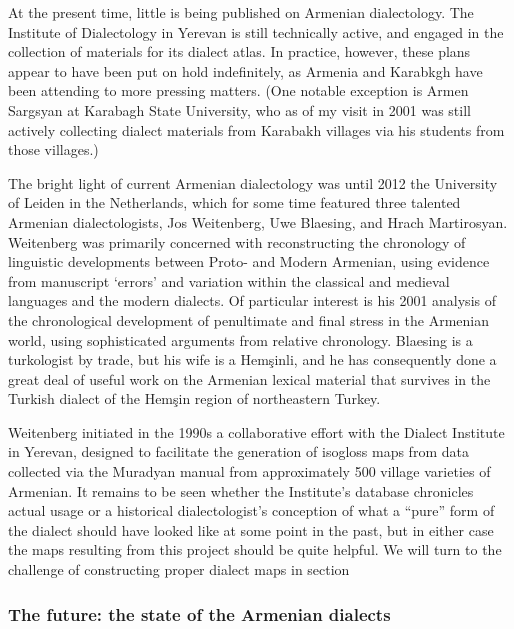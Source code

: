 At the present time, little is being published on Armenian dialectology. The Institute of Dialectology in Yerevan is still technically active, and engaged in the collection of materials for its dialect atlas. In practice, however, these plans appear to have been put on hold indefinitely, as Armenia and Karabkgh have been attending to more pressing matters. (One notable exception is Armen Sargsyan at Karabagh State University, who as of my visit in 2001 was still actively collecting dialect materials from Karabakh villages via his students from those villages.)

The bright light of current Armenian dialectology was until 2012 the University of Leiden in the Netherlands, which for some time featured three talented Armenian dialectologists, Jos Weitenberg, Uwe Blaesing, and Hrach Martirosyan. Weitenberg was primarily concerned with reconstructing the chronology of linguistic developments between Proto- and Modern Armenian, using evidence from manuscript `errors' and variation within the classical and medieval languages and the modern dialects. Of particular interest is his 2001 analysis of the chronological development of penultimate and final stress in the Armenian world, using sophisticated arguments from relative chronology. Blaesing is a turkologist by trade, but his wife is a Hemşinli, and he has consequently done a great deal of useful work on the Armenian lexical material that survives in the Turkish dialect of the Hemşin region of northeastern Turkey.

Weitenberg initiated in the 1990s a collaborative effort with the Dialect Institute in Yerevan, designed to facilitate the generation of isogloss maps from data collected via the  Muradyan manual from approximately 500 village varieties of Armenian. It remains to be seen whether the Institute’s database chronicles actual usage or a historical dialectologist’s conception of what a ``pure'' form of the dialect should have looked like at some point in the past, but in either case the maps resulting from this project should be quite helpful. We will turn to the challenge of constructing proper dialect maps in section 


\subsubsection{The future: the state of the Armenian dialects}

